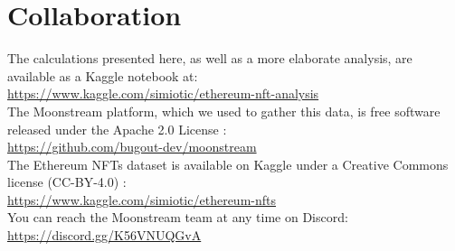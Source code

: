 \documentclass{article}
\begin{document}
\section{Collaboration}

The calculations presented here, as well as a more elaborate analysis, are available as a Kaggle notebook at:\\
\href{https://www.kaggle.com/simiotic/ethereum-nft-analysis}{https://www.kaggle.com/simiotic/ethereum-nft-analysis}\\

\noindent The Moonstream platform, which we used to gather this data, is free software released under the Apache 2.0 License \cite{apache-2}:\\
\href{https://github.com/bugout-dev/moonstream}{https://github.com/bugout-dev/moonstream}\\

\noindent The Ethereum NFTs dataset is available on Kaggle under a Creative Commons license (CC-BY-4.0) \cite{cc-by-4}:\\
\href{https://www.kaggle.com/simiotic/ethereum-nfts}{https://www.kaggle.com/simiotic/ethereum-nfts}\\

\noindent You can reach the Moonstream team at any time on Discord:\\
\href{https://discord.gg/K56VNUQGvA}{https://discord.gg/K56VNUQGvA}
\end{document}

